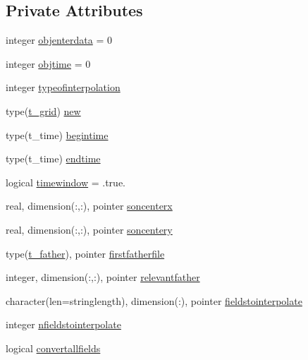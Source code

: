 \subsection*{Private Attributes}
\begin{DoxyCompactItemize}
\item 
integer \mbox{\hyperlink{structmodulepatchhdf5files_1_1t__patchhdf5files_aa9b98e3c92892360b37268e6dbf328f0}{objenterdata}} = 0
\item 
integer \mbox{\hyperlink{structmodulepatchhdf5files_1_1t__patchhdf5files_a6b82ba028f159d267a68ed632b41db8e}{objtime}} = 0
\item 
integer \mbox{\hyperlink{structmodulepatchhdf5files_1_1t__patchhdf5files_aaa95e06a7c7946705b11d6205ba6571f}{typeofinterpolation}}
\item 
type(\mbox{\hyperlink{structmodulepatchhdf5files_1_1t__grid}{t\+\_\+grid}}) \mbox{\hyperlink{structmodulepatchhdf5files_1_1t__patchhdf5files_a9ddf45fb626dbdafc8f07ae7b4f21d7e}{new}}
\item 
type(t\+\_\+time) \mbox{\hyperlink{structmodulepatchhdf5files_1_1t__patchhdf5files_a878f2bcb3aafe8af760535ba80dad667}{begintime}}
\item 
type(t\+\_\+time) \mbox{\hyperlink{structmodulepatchhdf5files_1_1t__patchhdf5files_a674b7c9b2a2ca05e7a7f8b819b5a1609}{endtime}}
\item 
logical \mbox{\hyperlink{structmodulepatchhdf5files_1_1t__patchhdf5files_ade5415848c4393fc24863504241a5d6e}{timewindow}} = .true.
\item 
real, dimension(\+:,\+:), pointer \mbox{\hyperlink{structmodulepatchhdf5files_1_1t__patchhdf5files_afe7edc65facc084e94d073c1dc6772c2}{soncenterx}}
\item 
real, dimension(\+:,\+:), pointer \mbox{\hyperlink{structmodulepatchhdf5files_1_1t__patchhdf5files_a3273da03987478a1cf811ff8c1d79149}{soncentery}}
\item 
type(\mbox{\hyperlink{structmodulepatchhdf5files_1_1t__father}{t\+\_\+father}}), pointer \mbox{\hyperlink{structmodulepatchhdf5files_1_1t__patchhdf5files_a646c13f601693793a1570c893c77e702}{firstfatherfile}}
\item 
integer, dimension(\+:,\+:), pointer \mbox{\hyperlink{structmodulepatchhdf5files_1_1t__patchhdf5files_a5b927d4ad05f9af4908cb49ccafbbac5}{relevantfather}}
\item 
character(len=stringlength), dimension(\+:), pointer \mbox{\hyperlink{structmodulepatchhdf5files_1_1t__patchhdf5files_a8127e0a796cc25312be05e5390d4d8e4}{fieldstointerpolate}}
\item 
integer \mbox{\hyperlink{structmodulepatchhdf5files_1_1t__patchhdf5files_afe60093f949841684e93c111a716aaaf}{nfieldstointerpolate}}
\item 
logical \mbox{\hyperlink{structmodulepatchhdf5files_1_1t__patchhdf5files_a4b8fe881e42de2db0b3c5049785cf6c7}{convertallfields}}
\end{DoxyCompactItemize}


